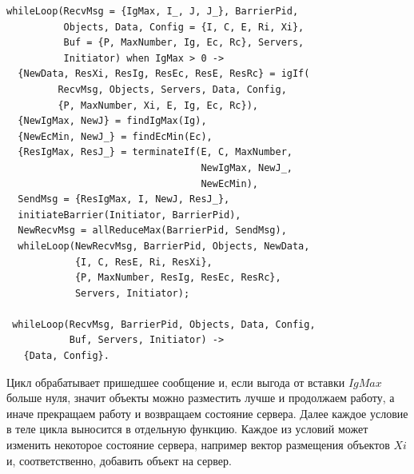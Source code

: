 			\begin{lstlisting}
whileLoop(RecvMsg = {IgMax, I_, J, J_}, BarrierPid, 
          Objects, Data, Config = {I, C, E, Ri, Xi},
          Buf = {P, MaxNumber, Ig, Ec, Rc}, Servers,
          Initiator) when IgMax > 0 ->
  {NewData, ResXi, ResIg, ResEc, ResE, ResRc} = igIf(
         RecvMsg, Objects, Servers, Data, Config, 
         {P, MaxNumber, Xi, E, Ig, Ec, Rc}),
  {NewIgMax, NewJ} = findIgMax(Ig),
  {NewEcMin, NewJ_} = findEcMin(Ec),
  {ResIgMax, ResJ_} = terminateIf(E, C, MaxNumber, 
                                  NewIgMax, NewJ_, 
                                  NewEcMin),
  SendMsg = {ResIgMax, I, NewJ, ResJ_},
  initiateBarrier(Initiator, BarrierPid),
  NewRecvMsg = allReduceMax(BarrierPid, SendMsg),
  whileLoop(NewRecvMsg, BarrierPid, Objects, NewData, 
            {I, C, ResE, Ri, ResXi}, 
            {P, MaxNumber, ResIg, ResEc, ResRc}, 
            Servers, Initiator);
  
 whileLoop(RecvMsg, BarrierPid, Objects, Data, Config, 
           Buf, Servers, Initiator) -> 
   {Data, Config}.				
			\end{lstlisting}
			Цикл обрабатывает пришедшее сообщение и, если выгода от вставки $IgMax$ больше нуля, значит объекты можно разместить лучше и продолжаем работу, а иначе прекращаем работу и возвращаем 
			состояние сервера. Далее каждое условие в теле цикла выносится в отдельную функцию. Каждое из условий может изменить некоторое состояние сервера, например вектор размещения объектов 
			$Xi$ и, соответственно, добавить объект на сервер.

